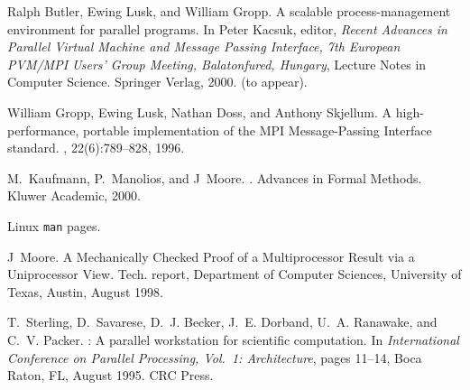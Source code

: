\documentclass{article}
\begin{document}
\begin{thebibliography}{1}

Ralph Butler, Ewing Lusk, and William Gropp.
\newblock A scalable process-management environment for parallel programs.
\newblock In Peter Kacsuk, editor, {\em Recent Advances in {P}arallel {V}irtual
  {M}achine and {M}essage {P}assing {I}nterface, 7th European PVM/MPI Users'
  Group Meeting, Balatonfured, Hungary}, Lecture Notes in Computer Science.
  Springer Verlag, 2000.
\newblock (to appear).

William Gropp, Ewing Lusk, Nathan Doss, and Anthony Skjellum.
\newblock A high-performance, portable implementation of the {MPI}
  {M}essage-{P}assing {I}nterface standard.
, 22(6):789--828, 1996.

M.~Kaufmann, P.~Manolios, and J~Moore.
.
\newblock Advances in Formal Methods. Kluwer Academic, 2000.

Linux {\tt man} pages.

J~Moore.
\newblock A {M}echanically {C}hecked {P}roof of a {M}ultiprocessor {R}esult via
  a {U}niprocessor {V}iew.
\newblock Tech. report, Department of Computer Sciences, University of Texas,
  Austin, August 1998.

T.~Sterling, D.~Savarese, D.~J. Becker, J.~E. Dorband, U.~A. Ranawake, and
  C.~V. Packer.
: {A} parallel workstation for scientific computation.
\newblock In {\em International Conference on Parallel Processing, Vol.~1:
  Architecture}, pages 11--14, Boca Raton, FL, August 1995. CRC Press.

\end{thebibliography}
\end{document}
